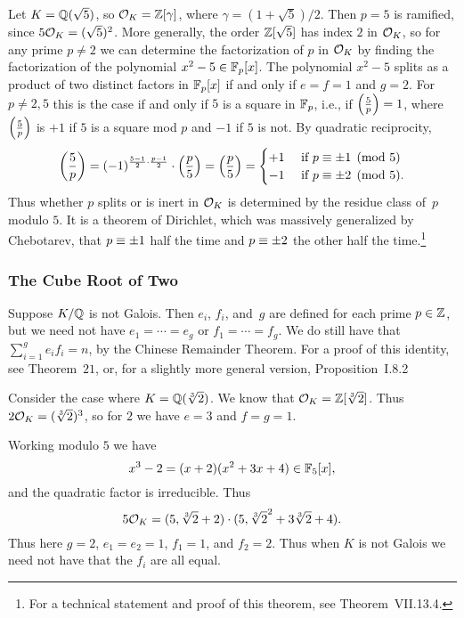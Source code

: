 \begin{example}\label{exam:decompQsqrt5}
Let $K=\mathbb{Q}(\sqrt{5})$, so $\mathcal{O}_K=\mathbb{Z}[\gamma]$, where
$\gamma=(1+\sqrt{5})/2$.  Then $p=5$ is ramified, since $5\mathcal{O}_K =
(\sqrt{5})^2$.  More generally, the order $\mathbb{Z}[\sqrt{5}]$ has index $2$
in $\mathcal{O}_K$, so for any prime $p\neq 2$ we can determine the
factorization of $p$ in $\mathcal{O}_K$ by finding the factorization of the
polynomial $x^2-5\in \mathbb{F}_p[x]$.  The polynomial $x^2-5$ splits as a
product of two distinct factors in $\mathbb{F}_p[x]$ if and only if $e=f=1$
and $g=2$.  For $p\neq 2,5$ this is the case if and only if $5$ is a
square in $\mathbb{F}_p$, i.e., if $\left(\frac{5}{p}\right) = 1$, where $\left(\frac{5}{p}\right)$ is $+1$
if $5$ is a square mod $p$ and $-1$ if $5$ is not.  By quadratic
reciprocity,
$$
 \left(\frac{5}{p}\right) = (-1)^{\frac{5-1}{2}\cdot \frac{p-1}{2}} \cdot \left(\frac{p}{5}\right) =
   \left(\frac{p}{5}\right) = \begin{cases} +1 & \text{ if } p\equiv \pm 1\pmod{5}\\ -1&\text{ if } p \equiv \pm 2\pmod{5}.\end{cases}
$$
Thus whether $p$ splits or is inert in
$\mathcal{O}_K$ is determined by the residue class of~$p$
modulo $5$.  It is a theorem of Dirichlet, which was massively
generalized by Chebotarev, that $p\equiv \pm 1$ half the time
and $p \equiv \pm 2$ the other half the time.\footnote{
For a technical statement and proof of this theorem,
see \cite{neukirch1999} Theorem~VII.13.4.}
\end{example}

\subsubsection*{The Cube Root of Two}

Suppose $K/\mathbb{Q}$ is not Galois.
Then $e_i$, $f_i$, and~$g$ are defined for each prime $p\in\mathbb{Z}$,
but we need not have $e_1=\cdots=e_g$ or $f_1=\cdots =f_g$.  We do still have that
$\sum_{i=1}^g e_i f_i = n$, by the Chinese Remainder Theorem.
For a proof of this identity, see \cite{marcus1977number} Theorem~$21$,
or, for a slightly more general version, \cite{neukirch1999} Proposition~I.8.2

Consider the case where $K=\mathbb{Q}(\sqrt[3]{2})$. We know that $\mathcal{O}_K = \mathbb{Z}[\sqrt[3]{2}]$.  Thus
$2\mathcal{O}_K = (\sqrt[3]{2})^3$, so for $2$ we have $e=3$ and $f=g=1$.

Working modulo $5$ we have
$$
 x^3 - 2 = (x+2)(x^2+3x+4) \in \mathbb{F}_5[x],
$$
and the quadratic factor is irreducible.  Thus
$$
 5\mathcal{O}_K = (5, \sqrt[3]{2}+2)\cdot (5, \sqrt[3]{2}^2 + 3\sqrt[3]{2} + 4).
$$
Thus here $g=2$, $e_1=e_2=1$, $f_1=1$, and $f_2=2$.
Thus when $K$ is not Galois we need not have that the $f_i$
are all equal.

